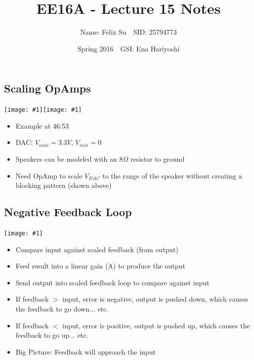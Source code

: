 \documentclass{article}\usepackage{amsmath,amssymb,amsthm,tikz,tkz-graph,color,chngpage,soul,hyperref,csquotes,graphicx,floatrow}\newcommand*{\QEDB}{\hfill\ensuremath{\square}}\newtheorem*{prop}{Proposition}\renewcommand{\theenumi}{\alph{enumi}}\usepackage[shortlabels]{enumitem}\usepackage[nobreak=true]{mdframed}\usetikzlibrary{matrix,calc}\MakeOuterQuote{"}\usepackage[margin=0.75in]{geometry} \newtheorem{theorem}{Theorem}
\title{EE16A - Lecture 15 Notes}
\author{Name: Felix Su$\quad$SID: 25794773}
\date{Spring 2016$\quad$GSI: Ena Hariyoshi}
\newcommand{\dincludegraphics}[1]{\texttt{[image: \#1]}}
\begin{document}
\maketitle

\subsection*{Scaling OpAmps}
\begin{center}\dincludegraphics{scaleop}\dincludegraphics{opvdac}\end{center}
\begin{itemize}
    \item Example at 46:53
    \item DAC: $V_{max}  = 3.3V$, $V_{min}= 0$
    \item Speakers can be modeled with an $8\Omega$ resistor to ground
    \item Need OpAmp to scale $V_{DAC}$ to the range of the speaker without creating a blocking pattern (shown above)
\end{itemize}
\subsection*{Negative Feedback Loop}
\begin{center}\dincludegraphics{nfl}\end{center}
\begin{itemize}
    \item Compare input against scaled feedback (from output)
    \item Feed result into a linear gain (A) to produce the output
    \item Send output into scaled feedback loop to compare against input
    \item If feedback $>$ input, error is negative, output is pushed down, which causes the feedback to go down... etc.
    \item If feedback $<$ input, error is positive, output is pushed up, which causes the feedback to go up... etc.
    \item Big Picture: Feedback will approach the input
\end{itemize}
\end{document}
